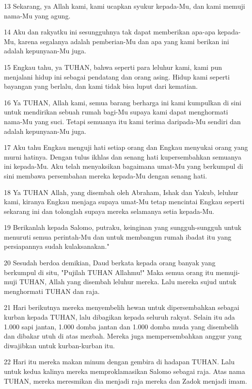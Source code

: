 \par 13 Sekarang, ya Allah kami, kami ucapkan syukur kepada-Mu, dan kami memuji nama-Mu yang agung.
\par 14 Aku dan rakyatku ini sesungguhnya tak dapat memberikan apa-apa kepada-Mu, karena segalanya adalah pemberian-Mu dan apa yang kami berikan ini adalah kepunyaan-Mu juga.
\par 15 Engkau tahu, ya TUHAN, bahwa seperti para leluhur kami, kami pun menjalani hidup ini sebagai pendatang dan orang asing. Hidup kami seperti bayangan yang berlalu, dan kami tidak bisa luput dari kematian.
\par 16 Ya TUHAN, Allah kami, semua barang berharga ini kami kumpulkan di sini untuk mendirikan sebuah rumah bagi-Mu supaya kami dapat menghormati nama-Mu yang suci. Tetapi semuanya itu kami terima daripada-Mu sendiri dan adalah kepunyaan-Mu juga.
\par 17 Aku tahu Engkau menguji hati setiap orang dan Engkau menyukai orang yang murni hatinya. Dengan tulus ikhlas dan senang hati kupersembahkan semuanya ini kepada-Mu. Aku telah menyaksikan bagaimana umat-Mu yang berkumpul di sini membawa persembahan mereka kepada-Mu dengan senang hati.
\par 18 Ya TUHAN Allah, yang disembah oleh Abraham, Ishak dan Yakub, leluhur kami, kiranya Engkau menjaga supaya umat-Mu tetap mencintai Engkau seperti sekarang ini dan tolonglah supaya mereka selamanya setia kepada-Mu.
\par 19 Berikanlah kepada Salomo, putraku, keinginan yang sungguh-sungguh untuk menuruti semua perintah-Mu dan untuk membangun rumah ibadat itu yang persiapannya sudah kulaksanakan."
\par 20 Sesudah berdoa demikian, Daud berkata kepada orang banyak yang berkumpul di situ, "Pujilah TUHAN Allahmu!" Maka semua orang itu memuji-muji TUHAN, Allah yang disembah leluhur mereka. Lalu mereka sujud untuk menghormati TUHAN dan raja.
\par 21 Hari berikutnya mereka menyembelih hewan untuk dipersembahkan sebagai kurban kepada TUHAN, lalu dibagikan kepada seluruh rakyat. Selain itu ada 1.000 sapi jantan, 1.000 domba jantan dan 1.000 domba muda yang disembelih dan dibakar utuh di atas mezbah. Mereka juga mempersembahkan anggur yang diwajibkan untuk kurban-kurban itu.
\par 22 Hari itu mereka makan minum dengan gembira di hadapan TUHAN. Lalu untuk kedua kalinya mereka memproklamasikan Salomo sebagai raja. Atas nama TUHAN, mereka meresmikan dia menjadi raja mereka dan Zadok menjadi imam.
